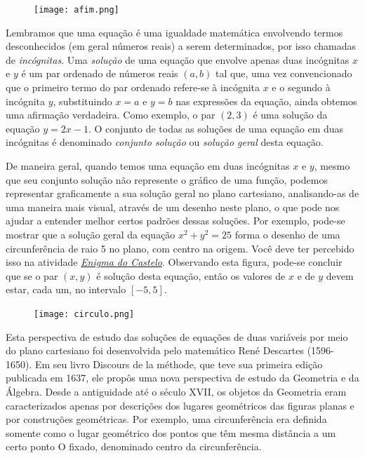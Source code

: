 \begin{figure}[H]
\centering

\noindent\texttt{[image: afim.png]}
\end{figure}


Lembramos que uma equação é uma igualdade matemática envolvendo termos desconhecidos (em geral números reais) a serem determinados, por isso chamadas de \emph{incógnitas}. Uma \emph{solução} de uma equação que envolve apenas duas incógnitas $x$ e $y$ é um par ordenado de números reais $(a,b)$ tal que, uma vez convencionado que o primeiro termo do par ordenado refere-se à incógnita $x$ e o segundo à incógnita $y$, substituindo $x = a$ e $y = b$ nas expressões da equação, ainda obtemos uma afirmação verdadeira. Como exemplo, o par $(2,3)$ é uma solução da equação $y = 2x-1$. O conjunto de todas as soluções de uma equação em duas incógnitas é denominado \emph{conjunto solução} ou \emph{solução geral} desta equação.

De maneira geral, quando temos uma equação em duas incógnitas $x$ e $y$, mesmo que seu conjunto solução não represente o gráfico de uma função, podemos representar graficamente a sua solução geral no plano cartesiano, analisando-as de uma maneira mais visual, através de um desenho neste plano, o que pode nos ajudar a entender melhor certos padrões dessas soluções. Por exemplo, pode-se mostrar que a solução geral da equação $x^2+y^2=25$ forma o desenho de uma circunferência de raio 5 no plano, com centro na origem. Você deve ter percebido isso na atividade \hyperref[castelo]{\textit{Enigma do Castelo}}. Observando esta figura, pode-se concluir que se o par $(x,y)$ é solução desta equação, então os valores de $x$ e de $y$ devem estar, cada um, no intervalo $[-5,5]$.

\begin{figure}[H]
\centering

\noindent\texttt{[image: circulo.png]}
\end{figure}

Esta perspectiva de estudo das soluções de equações de duas variáveis por meio do plano cartesiano foi desenvolvida pelo matemático René Descartes (1596-1650). Em seu livro Discours de la méthode, que teve sua primeira edição publicada em 1637, ele propôs uma nova perspectiva de estudo da Geometria e da Álgebra. Desde a antiguidade até o século XVII, os objetos da Geometria eram caracterizados apenas por descrições dos lugares geométricos das figuras planas e por construções geométricas. Por exemplo, uma circunferência era definida somente como o lugar geométrico dos pontos que têm mesma distância a um certo ponto O fixado, denominado centro da circunferência.

